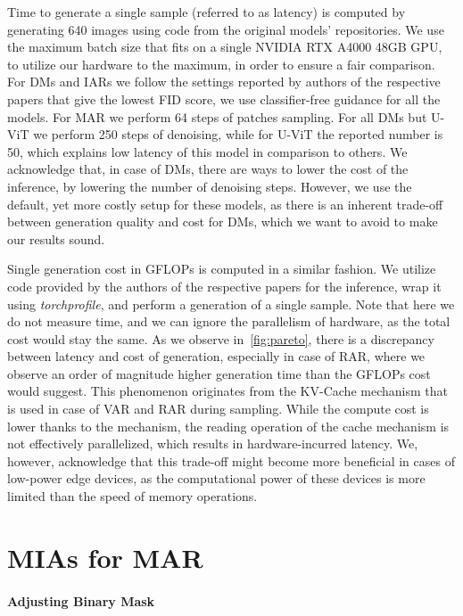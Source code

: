 Time to generate a single sample (referred to as latency) is computed by generating 640 images using code from the original models' repositories. We use the maximum batch size that fits on a single NVIDIA  RTX A4000 48GB GPU, to utilize our hardware to the maximum, in order to ensure a fair comparison. For DMs and IARs we follow the settings reported by authors of the respective papers that give the lowest FID score, \ie we use classifier-free guidance for all the models. For MAR we perform 64 steps of patches sampling. For all DMs but U-ViT we perform 250 steps of denoising, while for U-ViT the reported number is 50, which explains low latency of this model in comparison to others. We acknowledge that, in case of DMs, there are ways to lower the cost of the inference, \eg by lowering the number of denoising steps. However, we use the default, yet more costly setup for these models, as there is an inherent trade-off between generation quality and cost for DMs, which we want to avoid to make our results sound.

Single generation cost in GFLOPs is computed in a similar fashion. We utilize code provided by the authors of the respective papers for the inference, wrap it using \textit{torchprofile}, and perform a generation of a single sample. Note that here we do not measure time, and we can ignore the parallelism of hardware, as the total cost would stay the same. As we observe in~\cref{fig:pareto}, there is a discrepancy between latency and cost of generation, especially in case of RAR, where we observe an order of magnitude higher generation time than the GFLOPs cost would suggest. This phenomenon originates from the KV-Cache mechanism that is used in case of VAR and RAR during sampling. While the compute cost is lower thanks to the mechanism, the reading operation of the cache mechanism is not effectively parallelized, which results in hardware-incurred latency. We, however, acknowledge that this trade-off might become more beneficial in cases of low-power edge devices, as the computational power of these devices is more limited than the speed of memory operations.



\section{MIAs for MAR}
\label{app:mias_on_mar}




\paragraph{Adjusting Binary Mask}
\label{app:adjusting_mask}


